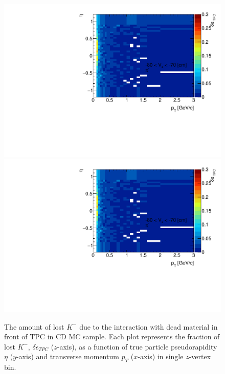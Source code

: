 \begin{figure}[H]
	\caption[The amount of lost $K^-$ due to the interaction with dead material in front of TPC as a function of $p_T$, $\eta$ and $z$-vertex in CD]{The amount of lost $K^-$ due to the interaction with dead material in front of TPC in CD MC sample. Each plot represents the fraction of lost $K^-$, $\delta\epsilon_{ TPC}$ ($z$-axis), as a function of true particle pseudorapidity $\eta$ ($y$-axis) and transverse momentum $p_{T}$ ($x$-axis) in single $z$-vertex bin.}\label{fig:dead_materialCD3DKm}
	\parbox{0.325\textwidth}{
		\includegraphics[width=\linewidth,page=17]{graphics/systematicsEfficiency/deadMaterial/secondaries_Unbinned_CD_.pdf}\\
		\includegraphics[width=\linewidth,page=20]{graphics/systematicsEfficiency/deadMaterial/secondaries_Unbinned_CD_.pdf}\\
}
\end{figure}
